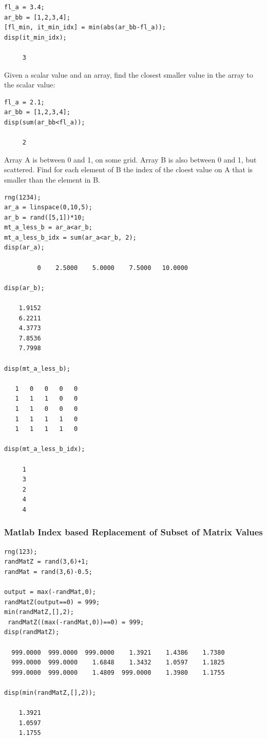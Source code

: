 \documentclass[
]{book}
\begin{document}
\begin{verbatim}
fl_a = 3.4;
ar_bb = [1,2,3,4];
[fl_min, it_min_idx] = min(abs(ar_bb-fl_a));
disp(it_min_idx);

     3
\end{verbatim}

Given a scalar value and an array, find the closest smaller value in the
array to the scalar value:

\begin{verbatim}
fl_a = 2.1;
ar_bb = [1,2,3,4];
disp(sum(ar_bb<fl_a));

     2
\end{verbatim}

Array A is between 0 and 1, on some grid. Array B is also between 0 and
1, but scattered. Find for each element of B the index of the cloest
value on A that is smaller than the element in B.

\begin{verbatim}
rng(1234);
ar_a = linspace(0,10,5);
ar_b = rand([5,1])*10;
mt_a_less_b = ar_a<ar_b;
mt_a_less_b_idx = sum(ar_a<ar_b, 2);
disp(ar_a);

         0    2.5000    5.0000    7.5000   10.0000

disp(ar_b);

    1.9152
    6.2211
    4.3773
    7.8536
    7.7998

disp(mt_a_less_b);

   1   0   0   0   0
   1   1   1   0   0
   1   1   0   0   0
   1   1   1   1   0
   1   1   1   1   0

disp(mt_a_less_b_idx);

     1
     3
     2
     4
     4
\end{verbatim}

\hypertarget{matlab-index-based-replacement-of-subset-of-matrix-values}{%
\subsubsection{Matlab Index based Replacement of Subset of Matrix Values}\label{matlab-index-based-replacement-of-subset-of-matrix-values}}

\begin{verbatim}
rng(123);
randMatZ = rand(3,6)+1;
randMat = rand(3,6)-0.5;
 
output = max(-randMat,0);
randMatZ(output==0) = 999;
min(randMatZ,[],2);
 randMatZ((max(-randMat,0))==0) = 999;
disp(randMatZ);

  999.0000  999.0000  999.0000    1.3921    1.4386    1.7380
  999.0000  999.0000    1.6848    1.3432    1.0597    1.1825
  999.0000  999.0000    1.4809  999.0000    1.3980    1.1755

disp(min(randMatZ,[],2));

    1.3921
    1.0597
    1.1755
\end{verbatim}
\end{document}
